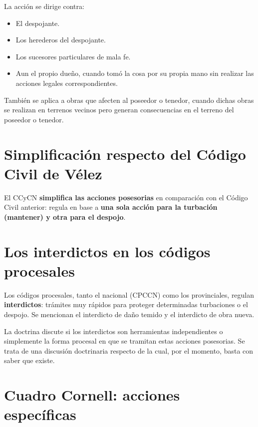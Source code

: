 \documentclass[12pt,oneside]{book}
\begin{document}
La acción se dirige contra:

\begin{itemize}
    \item El despojante.
    \item Los herederos del despojante.
    \item Los sucesores particulares de mala fe.
    \item Aun el propio dueño, cuando tomó la cosa por su propia mano sin realizar las acciones legales correspondientes.
\end{itemize}

También se aplica a obras que afecten al poseedor o tenedor, cuando dichas obras se realizan en terrenos vecinos pero generan consecuencias en el terreno del poseedor o tenedor.

\section{Simplificación respecto del Código Civil de Vélez}

El CCyCN \textbf{simplifica las acciones posesorias} en comparación con el Código Civil anterior: regula en base a \textbf{una sola acción para la turbación (mantener) y otra para el despojo}.

\section{Los interdictos en los códigos procesales}

Los códigos procesales, tanto el nacional (CPCCN) como los provinciales, regulan \textbf{interdictos}: trámites muy rápidos para proteger determinadas turbaciones o el despojo. Se mencionan el interdicto de daño temido y el interdicto de obra nueva.

La doctrina discute si los interdictos son herramientas independientes o simplemente la forma procesal en que se tramitan estas acciones posesorias. Se trata de una discusión doctrinaria respecto de la cual, por el momento, basta con saber que existe.

\section*{Cuadro Cornell: acciones específicas}
\end{document}

